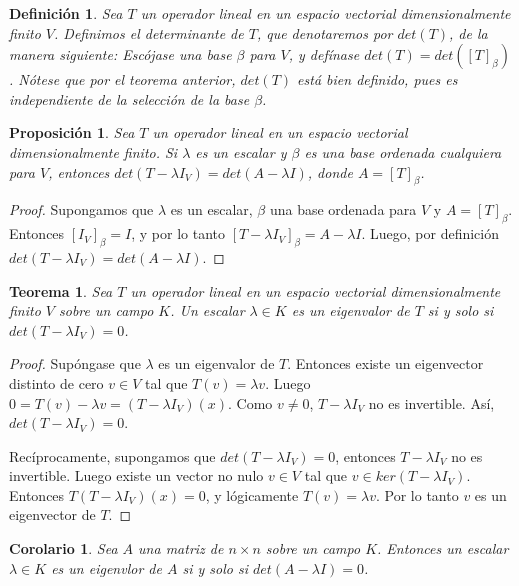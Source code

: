 \documentclass{book}
\newtheorem{theorem}{Teorema}
\newtheorem{proposition}{Proposición}
\newtheorem{definition}{Definición}
\newtheorem{corollary}{Corolario}
\begin{document}
\begin{definition}
Sea $T$ un operador lineal en un espacio vectorial dimensionalmente finito $V$. Definimos el determinante de $T$, que denotaremos por $det(T)$, de la manera siguiente: Escójase una base $\beta$ para $V$, y defínase $det(T)=det([T]_{\beta})$. Nótese que por el teorema anterior, $det(T)$ está bien definido, pues es independiente de la selección de la base $\beta$.
\end{definition}

\begin{proposition}
Sea $T$ un operador lineal en un espacio vectorial dimensionalmente finito. Si $\lambda$ es un escalar y $\beta$ es una base ordenada cualquiera para $V$, entonces $det(T-\lambda I_{V})=det(A-\lambda I)$, donde $A=[T]_{\beta}$.
\end{proposition}

\begin{proof}
Supongamos que $\lambda$ es un escalar, $\beta$ una base ordenada para $V$ y $A=[T]_{\beta}$. Entonces $[I_{V}]_{\beta}=I$, y por lo tanto $[T-\lambda I_{V}]_{\beta}=A-\lambda I$. Luego, por definición $det(T-\lambda I_{V})=det(A-\lambda I)$.
\end{proof}

\begin{theorem}
Sea $T$ un operador lineal en un espacio vectorial dimensionalmente finito $V$ sobre un campo $K$. Un escalar $\lambda \in K$ es un eigenvalor de $T$ si y solo si $det(T-\lambda I_{V})=0$.

\end{theorem}

\begin{proof}
Supóngase que $\lambda$ es un eigenvalor de $T$. Entonces existe un eigenvector distinto de cero $v\in V$ tal que $T(v)=\lambda v$. Luego $0=T(v)-\lambda v=(T-\lambda I_{V})(x)$. Como $v\neq 0$, $T-\lambda I_{V}$ no es invertible. Así, $det(T-\lambda I_{V})=0$. 

Recíprocamente, supongamos que $det(T-\lambda I_{V})=0$, entonces $T-\lambda I_{V}$ no es invertible. Luego existe un vector no nulo $v\in V$ tal que $v\in ker(T-\lambda I_{V})$. Entonces $T(T-\lambda I_{V})(x)=0$, y lógicamente $T(v)=\lambda v$. Por lo tanto $v$ es un eigenvector de $T$.
\end{proof}

\begin{corollary}
Sea $A$ una matriz de $n\times n$ sobre un campo $K$. Entonces un escalar $\lambda \in K$ es un eigenvlor de $A$ si y solo si $det(A-\lambda I)=0$.
\end{corollary}
\end{document}
